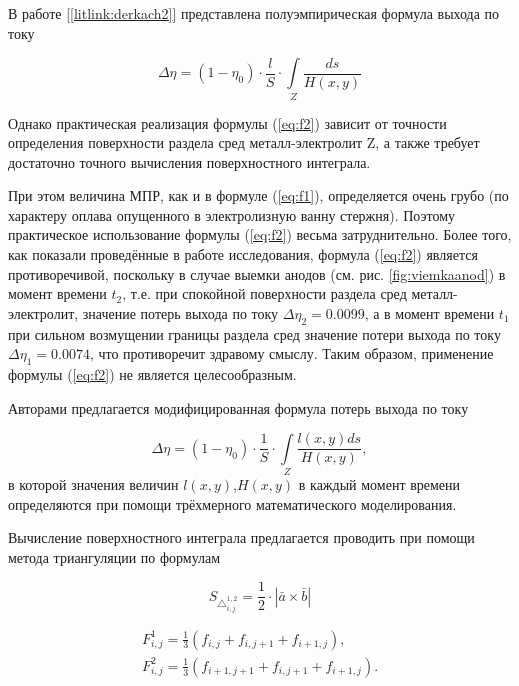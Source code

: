 \documentclass[]{pmi}
\begin{document}
В работе [\ref{litlink:derkach2}] представлена полуэмпирическая формула выхода по току

\begin{equation} \label{eq:f2}
\Delta \eta = (1- \eta_0) \cdot \frac{l}{S} \cdot \int\limits_Z \frac{ds}{H(x,y)}
\end{equation}

Однако практическая реализация формулы (\ref{eq:f2}) зависит от точности определения поверхности раздела сред металл-электролит Z, а также требует достаточно точного вычисления поверхностного интеграла. 

При этом величина МПР, как и в формуле (\ref{eq:f1}), определяется очень грубо (по характеру оплава опущенного в электролизную ванну стержня). Поэтому практическое использование формулы (\ref{eq:f2}) весьма затруднительно. Более того, как показали проведённые в работе исследования, формула (\ref{eq:f2}) является противоречивой, поскольку в случае выемки анодов (см. рис. \ref{fig:viemkaanod}) в момент времени $t_2$, т.е. при спокойной поверхности раздела сред металл-электролит, значение  потерь выхода по току $\Delta\eta_2 = 0.0099$, а в момент времени $t_1$ при сильном возмущении границы раздела сред значение потери выхода по току $\Delta\eta_1 = 0.0074$, что противоречит здравому смыслу.  Таким образом, применение формулы (\ref{eq:f2}) не является целесообразным.

Авторами предлагается модифицированная формула потерь выхода по току 

\begin{equation} \label{eq:modf2}
\Delta \eta = (1- \eta_0) \cdot \frac{1}{S} \cdot \int\limits_Z \frac{l(x,y) ds}{H(x,y)},
\end{equation}
в которой значения величин $l(x,y)$,$ H(x,y)$ в каждый момент времени определяются при помощи трёхмерного математического моделирования.

Вычисление поверхностного интеграла предлагается проводить при помощи метода триангуляции по формулам 

\begin{equation}\label{eq:triangsquare}
{S_{\triangle_{i,j}^{1,2}}} = \frac{1}{2} \cdot |\bar{a} \times \bar{b}|
\end{equation}

\begin{align}
F^1_{i,j} = \frac{1}{3}(f_{i,j}+f_{i,j+1}+f_{i+1,j}), \label{eq:triangf1}\\
F^2_{i,j} = \frac{1}{3}(f_{i+1,j+1}+f_{i,j+1}+f_{i+1,j}). \label{eq:triangf2}
\end{align}
\end{document}
